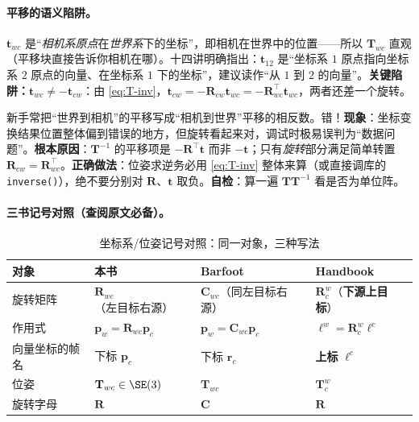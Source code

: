 \paragraph{平移的语义陷阱。}$\mathbf{t}_{wc}$ 是“\emph{相机系原点}在\emph{世界系}下的坐标”，即相机在世界中的位置——所以 $\mathbf{T}_{wc}$ 直观（平移块直接告诉你相机在哪）。十四讲明确指出：$\mathbf{t}_{12}$ 是“坐标系 $1$ 原点指向坐标系 $2$ 原点的向量、在坐标系 $1$ 下的坐标”，建议读作“从 $1$ 到 $2$ 的向量”\cite{gaoxiang2019slam14}。\textbf{关键陷阱：$\mathbf{t}_{wc}\neq-\mathbf{t}_{cw}$}：由 \cref{eq:T-inv}，$\mathbf{t}_{cw}=-\mathbf{R}_{cw}\mathbf{t}_{wc}=-\mathbf{R}_{wc}^\top\mathbf{t}_{wc}$，两者还差一个旋转。

\begin{pitfall}
新手常把“世界到相机”的平移写成“相机到世界”平移的相反数。错！\textbf{现象}：坐标变换结果位置整体偏到错误的地方，但旋转看起来对，调试时极易误判为“数据问题”。\textbf{根本原因}：$\mathbf{T}^{-1}$ 的平移项是 $-\mathbf{R}^\top\mathbf{t}$ 而非 $-\mathbf{t}$；只有\emph{旋转}部分满足简单转置 $\mathbf{R}_{cw}=\mathbf{R}_{wc}^\top$。\textbf{正确做法}：位姿求逆务必用 \cref{eq:T-inv} 整体来算（或直接调库的 \texttt{inverse()}），绝不要分别对 $\mathbf{R}$、$\mathbf{t}$ 取负。\textbf{自检}：算一遍 $\mathbf{T}\mathbf{T}^{-1}$ 看是否为单位阵。
\end{pitfall}

\paragraph{三书记号对照（查阅原文必备）。}
\begin{table}[H]\centering\small
\caption{坐标系/位姿记号对照：同一对象，三种写法}
\label{tab:rb-frame-notation}
\begin{tabular}{llll}
\toprule
对象 & 本书 & Barfoot\cite{barfoot2024state} & Handbook\cite{carlone2026handbook} \\
\midrule
旋转矩阵 & $\mathbf{R}_{wc}$（左目标右源）& $\mathbf{C}_{wc}$（同左目标右源）& $\mathbf{R}_c^{w}$（\textbf{下源上目标}）\\
作用式 & $\mathbf{p}_w=\mathbf{R}_{wc}\mathbf{p}_c$ & $\mathbf{p}_w=\mathbf{C}_{wc}\mathbf{p}_c$ & $\boldsymbol{\ell}^w=\mathbf{R}_c^{w}\boldsymbol{\ell}^c$ \\
向量坐标的帧名 & 下标 $\mathbf{p}_c$ & 下标 $\mathbf{r}_c$ & \textbf{上标} $\boldsymbol{\ell}^c$ \\
位姿 & $\mathbf{T}_{wc}\in\SE(3)$ & $\mathbf{T}_{wc}$ & $\mathbf{T}_c^{w}$ \\
旋转字母 & $\mathbf{R}$ & $\mathbf{C}$ & $\mathbf{R}$ \\
\bottomrule
\end{tabular}
\end{table}

